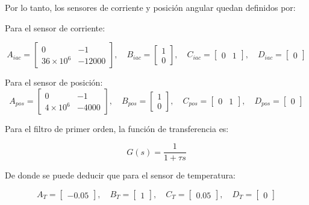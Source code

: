 \documentclass{article}
\begin{document}
Por lo tanto, los sensores de corriente y posición angular quedan definidos por:

Para el sensor de corriente:

\[
A_{iac} = \begin{bmatrix}
0 & -1 \\
36 \times 10^6 & -12000
\end{bmatrix}, \quad
B_{iac} = \begin{bmatrix}
1 \\
0
\end{bmatrix}, \quad
C_{iac} = \begin{bmatrix}
0 & 1
\end{bmatrix}, \quad
D_{iac} = \begin{bmatrix}
0
\end{bmatrix}
\]

Para el sensor de posición:
\[
A_{pos} = \begin{bmatrix}
0 & -1 \\
4 \times 10^6 & -4000
\end{bmatrix}, \quad
B_{pos} = \begin{bmatrix}
1 \\
0
\end{bmatrix}, \quad
C_{pos} = \begin{bmatrix}
0 & 1
\end{bmatrix}, \quad
D_{pos} = \begin{bmatrix}
0
\end{bmatrix}
\]

Para el filtro de primer orden, la función de transferencia es:

\begin{equation}
G(s) = \frac{1}{1 + \tau s}
\end{equation}

De donde se puede deducir que para el sensor de temperatura:

\[
A_T = \begin{bmatrix}
-0.05
\end{bmatrix}, \quad
B_T = \begin{bmatrix}
1
\end{bmatrix}, \quad
C_T = \begin{bmatrix}
0.05
\end{bmatrix}, \quad
D_T = \begin{bmatrix}
0
\end{bmatrix}
\]
\end{document}

